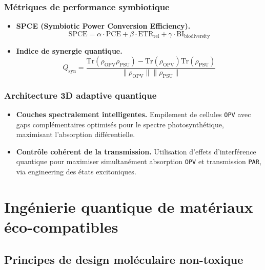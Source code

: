 \documentclass[12pt, a4paper]{article}
\begin{document}
\subsubsection{Métriques de performance symbiotique}

\begin{itemize}
    \item \textbf{SPCE (Symbiotic Power Conversion Efficiency).}
    \begin{equation}
    \text{SPCE} = \alpha \cdot \text{PCE} + \beta \cdot \text{ETR}_{\text{rel}} + \gamma \cdot \text{BI}_{\text{biodiversity}}
    \end{equation}
    
    \item \textbf{Indice de synergie quantique.}
    \begin{equation}
    Q_{\text{syn}} = \frac{\text{Tr}(\rho_{\text{OPV}}\rho_{\text{PSU}}) - \text{Tr}(\rho_{\text{OPV}})\text{Tr}(\rho_{\text{PSU}})}{\|\rho_{\text{OPV}}\| \|\rho_{\text{PSU}}\|}
    \end{equation}
\end{itemize}

\subsubsection{Architecture 3D adaptive quantique}

\begin{itemize}
    \item \textbf{Couches spectralement intelligentes.} Empilement de cellules \texttt{OPV} avec gaps complémentaires optimisés pour le spectre photosynthétique, maximisant l'absorption différentielle.
    
    \item \textbf{Contrôle cohérent de la transmission.} Utilisation d'effets d'interférence quantique pour maximiser simultanément absorption \texttt{OPV} et transmission \texttt{PAR}, via engineering des états excitoniques.
\end{itemize}

\section{Ingénierie quantique de matériaux éco-compatibles}

\subsection{Principes de design moléculaire non-toxique}
\end{document}
